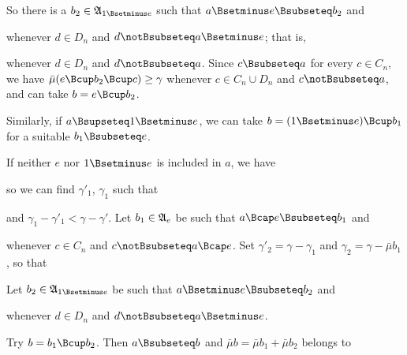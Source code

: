 {\noindent So there is a $b_2\in\frak A_{1\Bsetminus e}$ such that
$a\Bsetminus e\Bsubseteq b_2$ and


\noindent whenever $d\in D_n$ and $d\notBsubseteq a\Bsetminus e$;  that is,


\noindent whenever $d\in D_n$ and $d\notBsubseteq a$.   Since
$c\Bsubseteq a$ for every $c\in C_n$, we have
$\bar\mu(e\Bcup b_2\Bcup c)\ge\gamma$ whenever $c\in C_n\cup D_n$ and
$c\notBsubseteq a$, and can take $b=e\Bcup b_2$.

\medskip

 Similarly, if $a\Bsupseteq 1\Bsetminus e$, we can take
$b=(1\Bsetminus e)\Bcup b_1$ for a suitable $b_1\Bsubseteq e$.

\medskip

 If neither $e$ nor $1\Bsetminus e$ is included in $a$,
we have


\noindent so we can find $\gamma'_1$, $\gamma_1$ such that


\noindent and $\gamma_1-\gamma'_1<\gamma-\gamma'$.
Let $b_1\in\frak A_e$ be such that $a\Bcap e\Bsubseteq b_1$ and


\noindent whenever $c\in C_n$ and $c\notBsubseteq a\Bcap e$.   Set
$\gamma'_2=\gamma-\gamma_1$ and $\gamma_2=\gamma-\bar\mu b_1$, so that


\noindent Let
$b_2\in\frak A_{1\Bsetminus e}$ be such that $a\Bsetminus e\Bsubseteq b_2$
and


\noindent whenever $d\in D_n$ and $d\notBsubseteq a\Bsetminus e$.

Try $b=b_1\Bcup b_2$.   Then $a\Bsubseteq b$ and
$\bar\mu b=\bar\mu b_1+\bar\mu b_2$ belongs to

}

